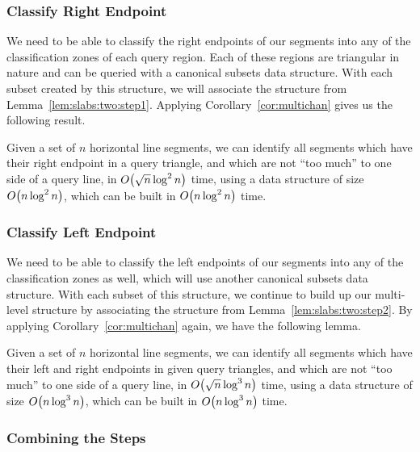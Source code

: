 \subsubsection{Classify Right Endpoint}

We need to be able to classify the right endpoints of our segments into any of the classification zones of each query region.
Each of these regions are triangular in nature and can be queried with a canonical subsets data structure. 
With each subset created by this structure, we will associate the structure from Lemma~\ref{lem:slabs:two:step1}. 
Applying Corollary~\ref{cor:multichan} gives us the following result.

\begin{lemma}
\label{lem:slabs:two:step2}
Given a set of $n$ horizontal line segments, we can identify all segments which have their right endpoint in a query triangle, and which are not ``too much'' to one side of a query line, in $O\!\left(\sqrt{n}\log^2{n}\right)$ time, using a data structure of size $O\!\left(n\log^2{n}\right)$, which can be built in $O\!\left(n\log^2{n}\right)$ time.
\end{lemma}


\subsubsection{Classify Left Endpoint}

We need to be able to classify the left endpoints of our segments into any of the classification zones as well, which will use another canonical subsets data structure.
With each subset of this structure, we continue to build up our multi-level structure by associating the structure from Lemma~\ref{lem:slabs:two:step2}. 
By applying Corollary~\ref{cor:multichan} again, we have the following lemma.

\begin{lemma}
\label{lem:slabs:two:step3}
Given a set of $n$ horizontal line segments, we can identify all segments which have their left and right endpoints in given query triangles, and which are not ``too much'' to one side of a query line, in $O\!\left(\sqrt{n}\log^3{n}\right)$ time, using a data structure of size $O\!\left(n\log^3{n}\right)$, which can be built in $O\!\left(n\log^3{n}\right)$ time.
\end{lemma}


\subsubsection{Combining the Steps}


